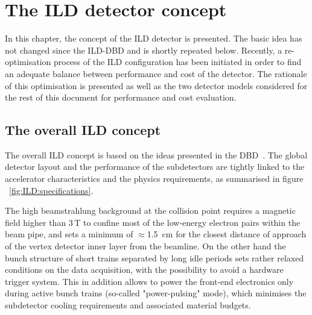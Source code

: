 \chapter{The ILD detector concept}
\label{chap:ILD}
In this chapter, the concept of the ILD detector is presented. The basic idea has not changed since the ILD-DBD and is shortly repeated below. Recently, a re-optimisation process of the ILD configuration has been initiated in order to find an adequate balance between performance and cost of the detector. The rationale of this optimisation is presented as well as the two detector models considered for the rest of this document for performance and cost evaluation. 

\section{The overall ILD concept}

The overall ILD concept is based on the ideas presented in the DBD~\cite{ild:bib:ilddbd}. The global detector layout and the performance of the subdetectors are tightly linked to the accelerator characteristics and the physics requirements, as summarised in figure ~\ref{fig:ILD:specifications}. 

The high beamstrahlung background at the collision point requires a magnetic field higher than 3\,T to confine most of the low-energy electron pairs  within the beam pipe, and sets a minimum of $\approx$1.5~cm for the closest distance of approach of the vertex detector inner layer from the beamline. On the other hand the bunch structure of short trains separated by long idle periods sets rather relaxed conditions on the data acquisition, with the possibility to avoid a hardware trigger system. This in addition allows to power the front-end electronics only during active bunch trains (so-called "power-pulsing" mode), which minimises the subdetector cooling requirements and associated material budgets.  


